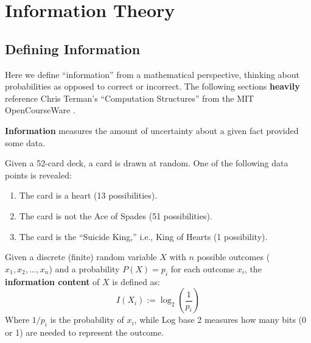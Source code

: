 \section{Information Theory}
\subsection{Defining Information}

\noindent
Here we define ``information'' from a mathematical perspective, thinking about probabilities as opposed to correct or incorrect. 
The following sections \textbf{heavily} reference Chris Terman's ``Computation Structures'' from the MIT OpenCourseWare \cite{terman2017computation_structures}.

\begin{Def}[Information]

    \label{def:info}

    \textbf{Information} measures the amount of uncertainty about a given fact provided some data.
\end{Def}

\begin{Example}

    \label{ex:card_info}

    Given a 52-card deck, a card is drawn at random. One of the following data points is revealed:
    \renewcommand{\labelenumi}{\alph{enumi})}
    \begin{enumerate}
        \item The card is a heart (13 possibilities).
        \item The card is not the Ace of Spades (51 possibilities).
        \item The card is the ``Suicide King,'' i.e., King of Hearts (1 possibility).
    \end{enumerate}

    \vspace{-1.5em}
\end{Example}

\begin{Def}

    \label{def:quant_info}

    Given a discrete (finite) random variable $X$ with $n$ possible outcomes ($x_1, x_2, \ldots, x_n$) and a probability $P(X) = p_i$ for each outcome $x_i$, the \textbf{information content} of $X$ is defined as:
    \[
    I(X_i) := \log_2\left(\dfrac{1}{p_i}\right)
    \]
    \noindent
    Where $1/p_i$ is the probability of $x_i$, while Log base 2 measures how many bits (0 or 1) are needed to represent the outcome.
\end{Def}

